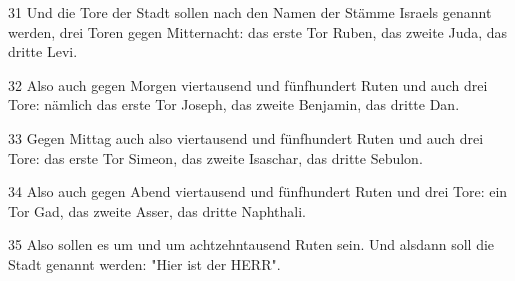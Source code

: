 \par 31 Und die Tore der Stadt sollen nach den Namen der Stämme Israels genannt werden, drei Toren gegen Mitternacht: das erste Tor Ruben, das zweite Juda, das dritte Levi.
\par 32 Also auch gegen Morgen viertausend und fünfhundert Ruten und auch drei Tore: nämlich das erste Tor Joseph, das zweite Benjamin, das dritte Dan.
\par 33 Gegen Mittag auch also viertausend und fünfhundert Ruten und auch drei Tore: das erste Tor Simeon, das zweite Isaschar, das dritte Sebulon.
\par 34 Also auch gegen Abend viertausend und fünfhundert Ruten und drei Tore: ein Tor Gad, das zweite Asser, das dritte Naphthali.
\par 35 Also sollen es um und um achtzehntausend Ruten sein. Und alsdann soll die Stadt genannt werden: "Hier ist der HERR".

